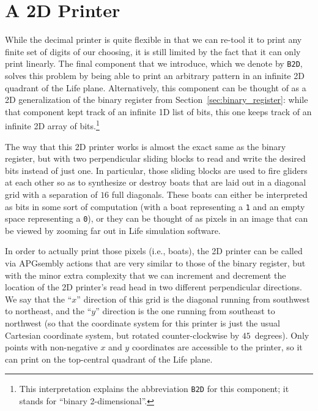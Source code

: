 \section{A 2D Printer}\label{sec:2dprinter}

While the decimal printer is quite flexible in that we can re-tool it to print any finite set of digits of our choosing, it is still limited by the fact that it can only print linearly. The final component that we introduce, which we denote by \texttt{B2D}, solves this problem by being able to print an arbitrary pattern in an infinite 2D quadrant of the Life plane. Alternatively, this component can be thought of as a 2D generalization of the binary register from Section~\ref{sec:binary_register}: while that component kept track of an infinite 1D list of bits, this one keeps track of an infinite 2D array of bits.\footnote{This interpretation explains the abbreviation \texttt{B2D} for this component; it stands for ``binary 2-dimensional''.}

The way that this 2D printer works is almost the exact same as the binary register, but with two perpendicular sliding blocks to read and write the desired bits instead of just one. In particular, those sliding blocks are used to fire gliders at each other so as to synthesize or destroy boats that are laid out in a diagonal grid with a separation of $16$ full diagonals. These boats can either be interpreted as bits in some sort of computation (with a boat representing a \texttt{1} and an empty space representing a \texttt{0}), or they can be thought of as pixels in an image that can be viewed by zooming far out in Life simulation software.

In order to actually print those pixels (i.e., boats), the 2D printer can be called via APGsembly actions that are very similar to those of the binary register, but with the minor extra complexity that we can increment and decrement the location of the 2D printer's read head  in two different perpendicular directions. We say that the ``$x$'' direction of this grid is the diagonal running from southwest to northeast, and the ``$y$'' direction is the one running from southeast to northwest (so that the coordinate system for this printer is just the usual Cartesian coordinate system, but rotated counter-clockwise by $45$~degrees). Only points with non-negative $x$ and $y$ coordinates are accessible to the printer, so it can print on the top-central quadrant of the Life plane.


